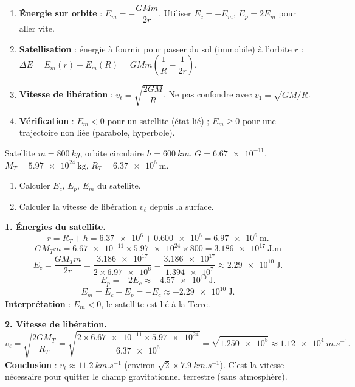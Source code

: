\documentclass[11pt]{article}
\begin{document}
\begin{methode}
\begin{enumerate}
\item \textbf{Énergie sur orbite} : $E_m = -\dfrac{GMm}{2r}$. Utiliser $E_c = -E_m$, $E_p = 2E_m$ pour aller vite.
\item \textbf{Satellisation} : énergie à fournir pour passer du sol (immobile) à l'orbite $r$ : $\Delta E = E_m(r) - E_m(R) = GMm\left(\dfrac{1}{R} - \dfrac{1}{2r}\right)$.
\item \textbf{Vitesse de libération} : $v_\ell = \sqrt{\dfrac{2GM}{R}}$. Ne pas confondre avec $v_1 = \sqrt{GM/R}$.
\item \textbf{Vérification} : $E_m < 0$ pour un satellite (état lié) ; $E_m \ge 0$ pour une trajectoire non liée (parabole, hyperbole).
\end{enumerate}
\end{methode}

\begin{exoresolu}
Satellite $m = \SI{800}{kg}$, orbite circulaire $h = \SI{600}{km}$. $G = \num{6,67e-11}$, $M_T = \num{5,97e24}\ \mathrm{kg}$, $R_T = \num{6,37e6}\ \mathrm{m}$.
\begin{enumerate}
\item Calculer $E_c$, $E_p$, $E_m$ du satellite.
\item Calculer la vitesse de libération $v_\ell$ depuis la surface.
\end{enumerate}
\tcblower
\textbf{1. Énergies du satellite.}
\[ r = R_T + h = \num{6,37e6} + \num{0,600e6} = \num{6,97e6}\ \mathrm{m}. \]
\[ GM_T m = \num{6,67e-11} \times \num{5,97e24} \times 800 = \num{3,186e17}\ \mathrm{J.m} \]
\[ E_c = \frac{GM_T m}{2r} = \frac{\num{3,186e17}}{2 \times \num{6,97e6}} = \frac{\num{3,186e17}}{\num{1,394e7}} \approx \num{2,29e10}\ \mathrm{J}. \]
\[ E_p = -2E_c \approx \num{-4,57e10}\ \mathrm{J}. \]
\[ E_m = E_c + E_p = -E_c \approx \num{-2,29e10}\ \mathrm{J}. \]
\textbf{Interprétation} : $E_m < 0$, le satellite est lié à la Terre.

\textbf{2. Vitesse de libération.}
\[ v_\ell = \sqrt{\frac{2GM_T}{R_T}} = \sqrt{\frac{2 \times \num{6,67e-11} \times \num{5,97e24}}{\num{6,37e6}}} = \sqrt{\num{1,250e8}} \approx \SI{1,12e4}{m.s^{-1}}. \]
\textbf{Conclusion} : $v_\ell \approx \SI{11,2}{km.s^{-1}}$ (environ $\sqrt{2} \times \SI{7,9}{km.s^{-1}}$). C'est la vitesse nécessaire pour quitter le champ gravitationnel terrestre (sans atmosphère).
\end{exoresolu}
\end{document}
